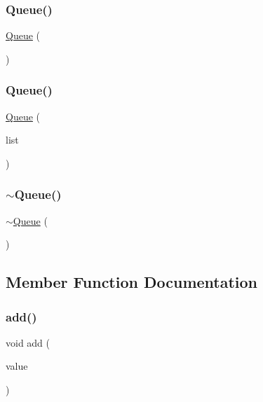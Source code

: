 \subsubsection{\texorpdfstring{Queue()}{Queue()}\hspace{0.1cm}{\footnotesize\ttfamily [1/2]}}
{\footnotesize\ttfamily \mbox{\hyperlink{classQueue}{Queue}} (\begin{DoxyParamCaption}{ }\end{DoxyParamCaption})}

\mbox{\label{classQueue_a0ad6572f7c8e567d440ef6735d2f4a32}} 
\subsubsection{\texorpdfstring{Queue()}{Queue()}\hspace{0.1cm}{\footnotesize\ttfamily [2/2]}}
{\footnotesize\ttfamily \mbox{\hyperlink{classQueue}{Queue}} (\begin{DoxyParamCaption}\item[{std\+::initializer\+\_\+list$<$ Value\+Type $>$}]{list }\end{DoxyParamCaption})}

\mbox{\label{classQueue_a240bdcfcc136e53aeaac3aa454cc26bf}} 
\subsubsection{\texorpdfstring{$\sim$\+Queue()}{~Queue()}}
{\footnotesize\ttfamily $\sim$\mbox{\hyperlink{classQueue}{Queue}} (\begin{DoxyParamCaption}{ }\end{DoxyParamCaption})\hspace{0.3cm}{\ttfamily [virtual]}}



\subsection{Member Function Documentation}
\mbox{\label{classQueue_ab901606bf3a8019c986f0cf9a9f298dc}} 
\subsubsection{\texorpdfstring{add()}{add()}}
{\footnotesize\ttfamily void add (\begin{DoxyParamCaption}\item[{const Value\+Type \&}]{value }\end{DoxyParamCaption})}

